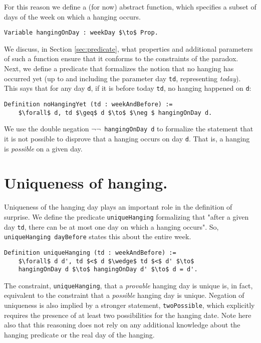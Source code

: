 \documentclass[runningheads]{llncs}
\begin{document}
For this reason we define a (for now) abstract function, which specifies a subset of
days of the week on which a hanging occurs.

\begin{lstlisting}[mathescape=true]
  Variable hangingOnDay : weekDay $\to$ Prop.
\end{lstlisting}

We discuss, in Section \ref{sec:predicate}, what properties and additional parameters of
such a function ensure that it conforms to the constraints of the paradox.
Next, we define a predicate that formalizes the notion that no hanging has occurred
yet (up to and including the parameter day {\tt td}, representing \emph{today}).
This says that for any day {\tt d}, if it is before today {\tt td}, no hanging
happened on {\tt d}:

\begin{lstlisting}[mathescape=true]
  Definition noHangingYet (td : weekAndBefore) :=
    $\forall$ d, td $\geq$ d $\to$ $\neg $ hangingOnDay d.
\end{lstlisting}

We use the double negation {\tt $\neg \neg$ hangingOnDay d} to formalize the statement that it is
not possible to disprove that a hanging occurs on day {\tt d}. That is, a hanging
is \emph{possible} on a given day.

\section{Uniqueness of hanging. }
\label{sec:unique}

Uniqueness of the hanging day plays an important role in the definition of surprise.
We define the predicate {\tt uniqueHanging} formalizing that "after a given day {\tt td},
there can be at most one day on which a hanging occurs". So,
{\tt uniqueHanging dayBefore} states this about the entire week.

\begin{lstlisting}[mathescape=true]
  Definition uniqueHanging (td : weekAndBefore) :=
    $\forall$ d d', td $<$ d $\wedge$ td $<$ d' $\to$
    hangingOnDay d $\to$ hangingOnDay d' $\to$ d = d'.
\end{lstlisting}

The constraint, {\tt uniqueHanging}, that
a \emph{provable} hanging day is unique is, in fact, equivalent to the constraint
that a \emph{possible} hanging day is unique. Negation of uniqueness
is also implied by a stronger statement, {\tt twoPossible}, which explicitly
requires the presence of at least two possibilities for the hanging date.
Note here also that this reasoning does not rely on any additional knowledge about
the hanging predicate or the real day of the hanging.
\end{document}
